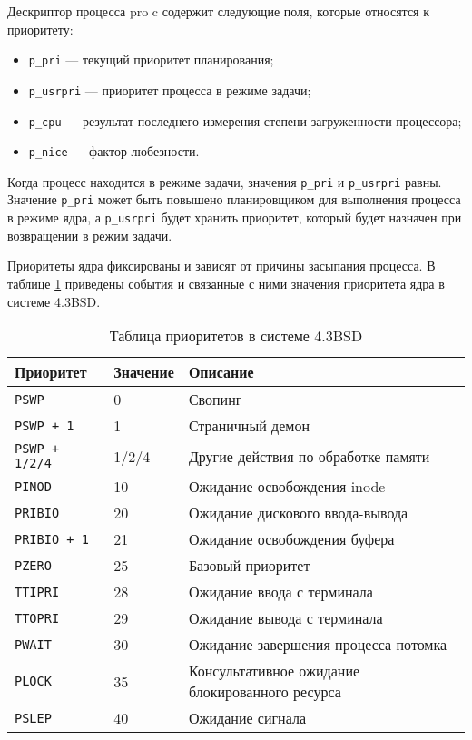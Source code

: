 Дескриптор процесса pro c содержит следующие поля, которые относятся к приоритету:
\begin{itemize}
	\item \texttt{p\_pri} --- текущий приоритет планирования;
	\item \texttt{p\_usrpri} --- приоритет процесса в режиме задачи;
	\item \texttt{p\_cpu} --- результат последнего измерения степени загруженности процессора;
	\item \texttt{p\_nice} --- фактор любезности.
\end{itemize}
Когда процесс находится в режиме задачи, значения \texttt{p\_pri} и \texttt{p\_usrpri} равны. Значение \texttt{p\_pri} может быть повышено планировщиком для выполнения процесса в режиме ядра, а \texttt{p\_usrpri} будет хранить приоритет, который будет назначен при возвращении в режим задачи. 

Приоритеты ядра фиксированы и зависят от причины засыпания процесса. В таблице \ref{bsd} приведены события и связанные с ними значения приоритета ядра в системе 4.3BSD. 

\begin{table}[ht!]
	\caption{Таблица приоритетов в системе 4.3BSD}
	\begin{center}
		\begin{tabular}{ |l|l|p{}|  }
			\hline
			\textbf{Приоритет} & \textbf{Значение} & \textbf{Описание} \\ \hline
			\texttt{PSWP} & 0 & Свопинг \\
			\texttt{PSWP + 1} & 1 & Страничный демон \\
			\texttt{PSWP + 1/2/4} & 1/2/4 & Другие действия по обработке памяти \\
			\texttt{PINOD} & 10 & Ожидание освобождения inode \\
			\texttt{PRIBIO} & 20 & Ожидание дискового ввода-вывода \\
			\texttt{PRIBIO + 1} & 21 & Ожидание освобождения буфера \\
			\texttt{PZERO} & 25 & Базовый приоритет \\
			\texttt{TTIPRI} & 28 & Ожидание ввода с терминала \\
			\texttt{TTOPRI} & 29 & Ожидание вывода с терминала \\ 
			\texttt{PWAIT} & 30 & Ожидание завершения процесса потомка \\
			\texttt{PLOCK} & 35 & Консультативное ожидание блокированного ресурса \\
			\texttt{PSLEP} & 40 & Ожидание сигнала \\
			\hline
		\end{tabular}
		\label{bsd}
	\end{center}
\end{table}


